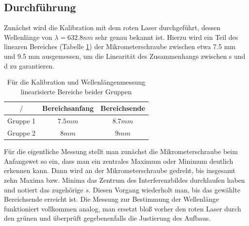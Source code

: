 \documentclass[a4paper, 11pt]{article}
\begin{document}
\subsection{Durchführung}
Zunächst wird die Kalibration mit dem roten Laser durchgeführt, dessen Wellenlänge von $\lambda = 632.8 nm$ sehr genau bekannt ist. Hierzu wird ein Teil des linearen Bereiches (Tabelle \ref{table:lin_Bereich}) der Mikrometerschraube zwischen etwa 7.5 mm und 9.5 mm ausgemessen, um die Linearität des Zusammenhangs zwischen s und d zu garantieren.
\begin{table}[H]
	\large
	\centering
	\begin{tabular}{|c|c|c|}
		\hline  $/$	&	Bereichsanfang	&	Bereichsende	\\
		\hline	Gruppe 1	&	$ 7.5 mm$		&	$ 8.7 mm$ \\
		\hline  Gruppe 2	&	$ 8 mm $		&	$ 9 mm$ \\
		\hline
	\end{tabular}
	\caption{Für die Kalibration und Wellenlängenmessung linearisierte Bereiche beider Gruppen}
	\label{table:lin_Bereich}
\end{table}
Für die eigentliche Messung stellt man zunächst die Mikrometerschraube beim Anfangswet so ein, dass man ein zentrales Maximum oder Minimum deutlich erkennen kann. Dann wird an der Mikrometerschraube gedreht, bis insgesamt zehn Maxima bzw. Minima das Zentrum des Interferenzbildes durchlaufen haben und notiert das zugehörige $s$. Diesen Vorgang wiederholt man, bis das gewählte Bereichsende erreicht ist. \newline
Die Messung zur Bestimmung der Wellenlänge funktioniert vollkommen analog, man ersetzt bloß vorher den roten Laser durch den grünen und überprüft gegebenenfalls die Justierung des Aufbaus.
\end{document}

